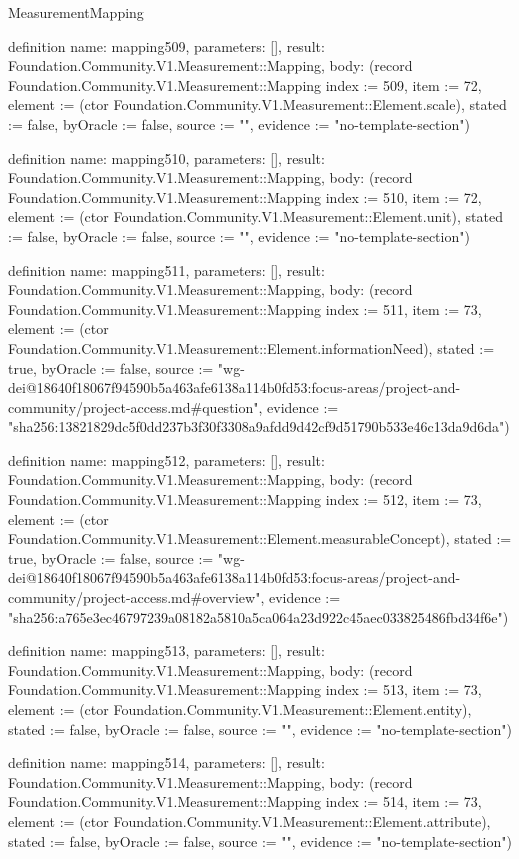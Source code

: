 \begin{lexlean}{MeasurementMapping}
\begin{semanticmodule}
definition{
  name: mapping509,
  parameters: [],
  result: Foundation.Community.V1.Measurement::Mapping,
  body: (record Foundation.Community.V1.Measurement::Mapping {index := 509, item := 72, element := (ctor Foundation.Community.V1.Measurement::Element.scale), stated := false, byOracle := false, source := "", evidence := "no-template-section"})
}

definition{
  name: mapping510,
  parameters: [],
  result: Foundation.Community.V1.Measurement::Mapping,
  body: (record Foundation.Community.V1.Measurement::Mapping {index := 510, item := 72, element := (ctor Foundation.Community.V1.Measurement::Element.unit), stated := false, byOracle := false, source := "", evidence := "no-template-section"})
}

definition{
  name: mapping511,
  parameters: [],
  result: Foundation.Community.V1.Measurement::Mapping,
  body: (record Foundation.Community.V1.Measurement::Mapping {index := 511, item := 73, element := (ctor Foundation.Community.V1.Measurement::Element.informationNeed), stated := true, byOracle := false, source := "wg-dei@18640f18067f94590b5a463afe6138a114b0fd53:focus-areas/project-and-community/project-access.md#question", evidence := "sha256:13821829dc5f0dd237b3f30f3308a9afdd9d42cf9d51790b533e46c13da9d6da"})
}

definition{
  name: mapping512,
  parameters: [],
  result: Foundation.Community.V1.Measurement::Mapping,
  body: (record Foundation.Community.V1.Measurement::Mapping {index := 512, item := 73, element := (ctor Foundation.Community.V1.Measurement::Element.measurableConcept), stated := true, byOracle := false, source := "wg-dei@18640f18067f94590b5a463afe6138a114b0fd53:focus-areas/project-and-community/project-access.md#overview", evidence := "sha256:a765e3ec46797239a08182a5810a5ca064a23d922c45aec033825486fbd34f6e"})
}

definition{
  name: mapping513,
  parameters: [],
  result: Foundation.Community.V1.Measurement::Mapping,
  body: (record Foundation.Community.V1.Measurement::Mapping {index := 513, item := 73, element := (ctor Foundation.Community.V1.Measurement::Element.entity), stated := false, byOracle := false, source := "", evidence := "no-template-section"})
}

definition{
  name: mapping514,
  parameters: [],
  result: Foundation.Community.V1.Measurement::Mapping,
  body: (record Foundation.Community.V1.Measurement::Mapping {index := 514, item := 73, element := (ctor Foundation.Community.V1.Measurement::Element.attribute), stated := false, byOracle := false, source := "", evidence := "no-template-section"})
}


\end{semanticmodule}
\end{lexlean}
